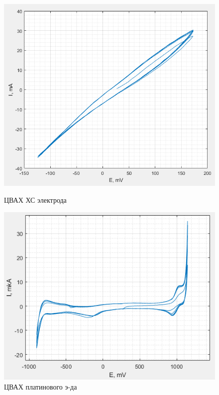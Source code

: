 \documentclass[a4paper, 12pt]{article}
\begin{document}
\begin{figure}[h!] %
\begin{center}
\begin{minipage}[h]{0.40\linewidth}
\includegraphics[width=1\linewidth]{2 AgCl.png}
\caption{ЦВАХ ХС электрода} %
\label{ris:experimoriginal} %
\end{minipage}
\hfill 
\begin{minipage}[h]{0.40\linewidth}
\includegraphics[width=1\linewidth]{2 Pt.png}
\caption{ЦВАХ платинового э-да}
\label{ris:experimcoded}
\end{minipage}
\end{center}
\end{figure}
\end{document}
